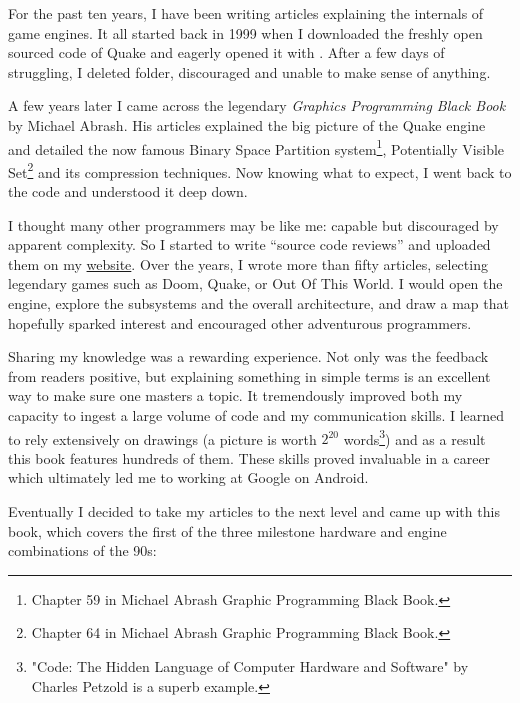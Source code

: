 \documentclass[book.tex]{subfiles}
\begin{document}
For the past ten years, I have been writing articles explaining the internals of game engines. It all started back in 1999 when I downloaded the freshly open sourced code of \mbox{Quake} and eagerly opened it with . After a few days of struggling, I deleted  folder, discouraged and unable to make sense of anything.

\bigskip

A few years later I came across the legendary \textit{Graphics Programming Black Book} by Michael Abrash. His articles explained the big picture of the Quake engine and detailed the now famous Binary Space Partition system\footnote{Chapter 59 in Michael Abrash Graphic Programming Black Book.}, Potentially Visible Set\footnote{Chapter 64 in Michael Abrash Graphic Programming Black Book.} and its compression techniques. Now knowing what to expect, I went back to the code and understood it deep down.

\bigskip

I thought many other programmers may be like me: capable but discouraged by apparent complexity. So I started to write ``source  code reviews'' and uploaded them on my
\href{http://fabiensanglard.net}{website}. Over the years, I wrote more than fifty articles, selecting legendary games such as Doom, Quake, or Out Of This World. I would open the engine, explore the subsystems and the overall architecture, and draw a map that hopefully sparked interest and encouraged other adventurous programmers.

\bigskip

Sharing my knowledge was a rewarding experience. Not only was the feedback from readers positive, but explaining something in simple terms is an excellent way to make sure one masters a topic. It tremendously improved both my capacity to ingest a large volume of code and my communication skills. I learned to rely extensively on drawings (a picture is worth $2^{20}$ words\footnote{"Code: The Hidden Language of Computer Hardware and Software" by Charles Petzold is a superb example.}) and as a result this book features hundreds of them. These skills proved invaluable in a career which ultimately led me to working at Google on Android.\\
\par

Eventually I decided to take my articles to the next level and came up with this book, which covers the first of the three milestone hardware and engine combinations of the 90s:
\pagebreak
\end{document}
